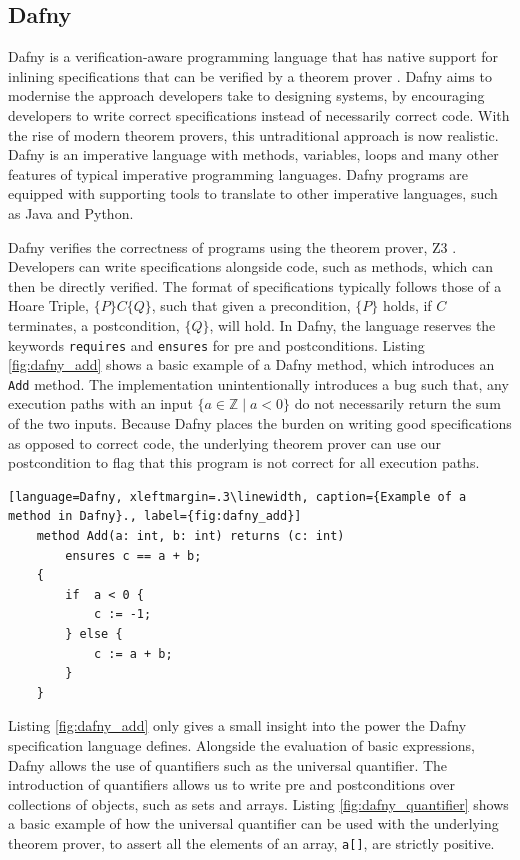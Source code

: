 \subsection{Dafny}
Dafny is a verification-aware programming language that has native support for inlining specifications that can be verified by a theorem prover \cite{dafny_paper}. Dafny aims to modernise the approach developers take to designing systems, by encouraging developers to write correct specifications instead of necessarily correct code. With the rise of modern theorem provers, this untraditional approach is now realistic. Dafny is an imperative language with methods, variables, loops and many other features of typical imperative programming languages. Dafny programs are equipped with supporting tools to translate to other imperative languages, such as Java and Python. 
\par
Dafny verifies the correctness of programs using the theorem prover, Z3 \cite{z3}. Developers can write specifications alongside code, such as methods, which can then be directly verified. The format of specifications typically follows those of a Hoare Triple, $\{P\}C\{Q\}$, such that given a precondition, $\{P\}$ holds, if $C$ terminates, a postcondition, $\{Q\}$, will hold. In Dafny, the language reserves the keywords \texttt{requires} and \texttt{ensures} for pre and postconditions. Listing \ref{fig:dafny_add} shows a basic example of a Dafny method, which introduces an \texttt{Add} method. The implementation unintentionally introduces a bug such that, any execution paths with an input $\{ a \in \mathbb{Z} \mid a < 0 \}$ do not necessarily return the sum of the two inputs. Because Dafny places the burden on writing good specifications as opposed to correct code, the underlying theorem prover can use our postcondition to flag that this program is not correct for all execution paths.
\begin{lstlisting}[language=Dafny, xleftmargin=.3\linewidth, caption={Example of a method in Dafny}., label={fig:dafny_add}]
    method Add(a: int, b: int) returns (c: int)
        ensures c == a + b;
    {
        if  a < 0 {
            c := -1;
        } else {
            c := a + b;
        }
    }
\end{lstlisting}
\par
Listing \ref{fig:dafny_add} only gives a small insight into the power the Dafny specification language defines. Alongside the evaluation of basic expressions, Dafny allows the use of quantifiers such as the universal quantifier. The introduction of quantifiers allows us to write pre and postconditions over collections of objects, such as sets and arrays. Listing \ref{fig:dafny_quantifier} shows a basic example of how the universal quantifier can be used with the underlying theorem prover, to assert all the elements of an array, \texttt{a[]}, are strictly positive.
